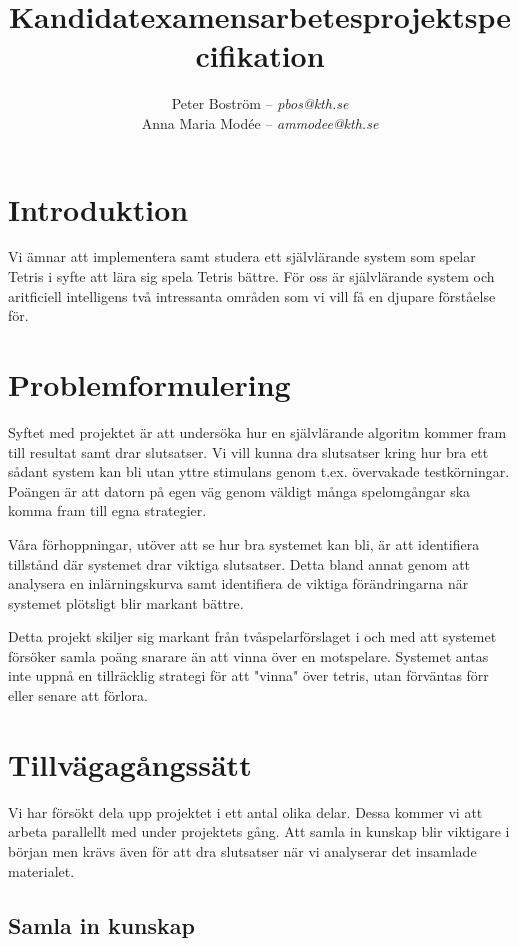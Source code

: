 \documentclass[a4paper,11pt]{article}
\title{Kandidatexamensarbetesprojektspecifikation}
\author{Peter Boström -- \emph{pbos@kth.se}\\Anna Maria Modée -- \emph{ammodee@kth.se}}
\begin{document}
\maketitle
 \pagestyle{fancyplain}

\section*{Introduktion}

Vi ämnar att implementera samt studera ett självlärande system som spelar Tetris i syfte att lära sig spela Tetris bättre. För oss är självlärande system och aritficiell intelligens två intressanta områden som vi vill få en djupare förståelse för.

\section*{Problemformulering}

Syftet med projektet är att undersöka hur en självlärande algoritm kommer fram till resultat samt drar slutsatser. Vi vill kunna dra slutsatser kring hur bra ett sådant system kan bli utan yttre stimulans genom t.ex. övervakade testkörningar. Poängen är att datorn på egen väg genom väldigt många spelomgångar ska komma fram till egna strategier.

Våra förhoppningar, utöver att se hur bra systemet kan bli, är att identifiera tillstånd där systemet drar viktiga slutsatser. Detta bland annat genom att analysera en inlärningskurva samt identifiera de viktiga förändringarna när systemet plötsligt blir markant bättre.

Detta projekt skiljer sig markant från tvåspelarförslaget i och med att systemet försöker samla poäng snarare än att vinna över en motspelare. Systemet antas inte uppnå en tillräcklig strategi för att "vinna" över tetris, utan förväntas förr eller senare att förlora.

\section*{Tillvägagångssätt}

Vi har försökt dela upp projektet i ett antal olika delar. Dessa kommer vi att arbeta parallellt med under projektets gång. Att samla in kunskap blir viktigare i början men krävs även för att dra slutsatser när vi analyserar det insamlade materialet.

\subsection*{Samla in kunskap}
\end{document}
